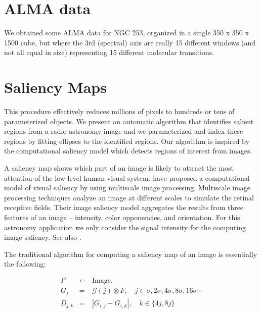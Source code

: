 \section{ALMA data}

We obtained some ALMA data for NGC 253, organized in a single 350 x 350 x 1500 cube, but where the 3rd (spectral) axis are really 15 different windows (and not all equal in size) representing 15 different molecular transitions.


\section{Saliency Maps}

This procedure effectively reduces millions of pixels to hundreds or tens of parameterized objects.  We present an automatic algorithm that identifies salient regions from a radio astronomy image and we parameterized and index these regions by fitting ellipses to the identified regions.  Our algorithm is inspired by the computational saliency model which detects regions of interest from images.


A saliency map shows which part of an image is likely to attract the most attention of the low-level human visual system. \cite{itti98:_model_of_salien_based_visual} have proposed a computational model of visual saliency by using multiscale image processing.  Multiscale image processing techniques analyze an image at different scales to simulate the retinal receptive fields.  Their image saliency model aggregates the results from three features of an image -- intensity, color opponencies, and orientation. For this astronomy application we only consider the signal intensity for the computing image saliency. See also \citep{ip2012hierarchical}.

The traditional algorithm for computing a saliency map of an image is essentially the following:

\begin{eqnarray*}
  \label{eqn:sal}
  F      & \leftarrow & \mathrm{Image}, \\
  G_{j}   & =          & \mathcal{G}(j) \otimes F, \quad j \in{\sigma,2\sigma,4\sigma,8\sigma,16\sigma
 \cdots}\\
  D_{j,k}  & =         & |G_{i,j} - G_{i,k}|, \quad k \in \{4j,8j\}\\
\end{eqnarray*}


